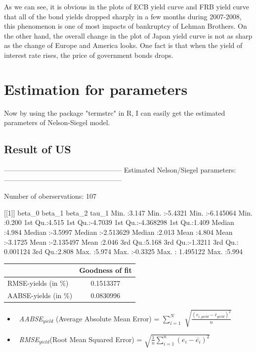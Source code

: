 \documentclass{article}
\begin{document}
\begin{spacing}{1.5}
 As we can see, it is obvious in the plots of ECB yield curve and FRB yield curve that all of the bond yields dropped sharply in a few months during 2007-2008, this phenomenon is one of most impacts of bankruptcy of Lehman Brothers. On the other hand, the overall change in the plot of Japan yield curve is not as sharp as the change of Europe and America looks. One fact is that when the yield of interest rate rises, the price of government bonds drops.
\section{Estimation for parameters}
 Now by using the package "termstrc" in R, I can easily get the estimated parameters of Nelson-Siegel model.
 \subsection{Result of US}
\begin{Schunk}
\begin{Soutput}
---------------------------------------------------
Estimated Nelson/Siegel parameters:
---------------------------------------------------

Number of oberservations: 107 

[[1]]
     beta_0          beta_1            beta_2              tau_1      
 Min.   :3.147   Min.   :-5.4321   Min.   :-6.145064   Min.   :0.200  
 1st Qu.:4.515   1st Qu.:-4.7039   1st Qu.:-4.368298   1st Qu.:1.409  
 Median :4.984   Median :-3.5997   Median :-2.513629   Median :2.013  
 Mean   :4.804   Mean   :-3.1725   Mean   :-2.135497   Mean   :2.046  
 3rd Qu.:5.168   3rd Qu.:-1.3211   3rd Qu.: 0.001124   3rd Qu.:2.808  
 Max.   :5.974   Max.   :-0.3325   Max.   : 1.495122   Max.   :5.994  
\end{Soutput}
\end{Schunk}

\begin{center}
\begin{tabular}{|l||c|}\hline
                        & Goodness of fit \\ \hline
RMSE-yields (in \%)     & 0.1513377   \\ \hline
AABSE-yields (in \%)    & 0.0830996   \\ \hline
\end{tabular}
\end{center}


\begin{itemize}
\item\ {\it AABSE}$_{yield}$ (Average Absolute Mean Error) = $\sum_{i=1}^N$ $\sqrt{\frac{(e_{i,yield}-\bar{e}_{yield})^2}{n}}$
\item\ {\it RMSE}$_{yield}$(Root Mean Squared Error) = $\sqrt{\frac{1}{n}\sum_{i=1}^n (e_i-\bar{e_i})^2}$
\end{itemize}


\end{spacing}
\end{document}
